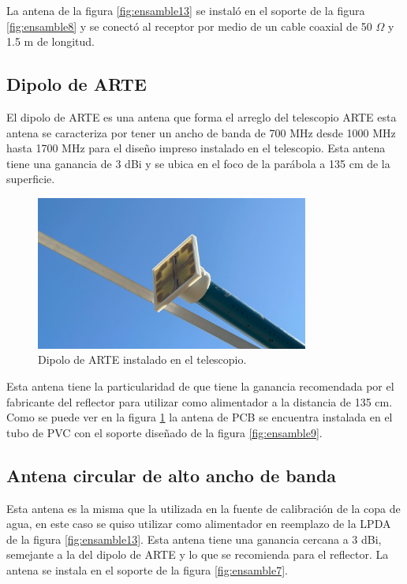 La antena de la figura \ref{fig:ensamble13} se instaló en el soporte de la figura \ref{fig:ensamble8} y se conectó al receptor por medio de un cable coaxial de 50 $\Omega$ y 1.5 m de longitud.\\

\subsection{Dipolo de ARTE}

El dipolo de ARTE es una antena que forma el arreglo del telescopio ARTE \cite{Gallardo2023} esta antena se caracteriza por tener un ancho de banda de 700 MHz desde 1000 MHz hasta 1700 MHz para el diseño impreso instalado en el telescopio. Esta antena tiene una ganancia de 3 dBi y se ubica en el foco de la parábola a 135 cm de la superficie.\\

\begin{figure}
    \centering
    \includegraphics[width=0.8\textwidth]{img/feed}
    \caption{Dipolo de ARTE instalado en el telescopio.}
    \label{fig:ensamble14}
\end{figure}

Esta antena tiene la particularidad de que tiene la ganancia recomendada por el fabricante del reflector para utilizar como alimentador a la distancia de 135 cm. Como se puede ver en la figura \ref{fig:ensamble14} la antena de PCB se encuentra instalada en el tubo de PVC con el soporte diseñado de la figura \ref{fig:ensamble9}.\\

\subsection{Antena circular de alto ancho de banda}

Esta antena es la misma que la utilizada en la fuente de calibración de la copa de agua, en este caso se quiso utilizar como alimentador en reemplazo de la LPDA de la figura \ref{fig:ensamble13}. Esta antena tiene una ganancia cercana a 3 dBi, semejante a la del dipolo de ARTE y lo que se recomienda para el reflector. La antena se instala en el soporte de la figura \ref{fig:ensamble7}.\\

